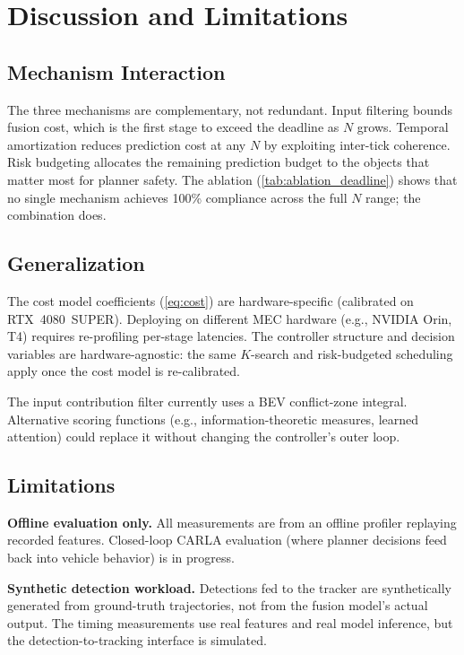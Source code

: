 \section{Discussion and Limitations}
\label{sec:discussion}

\subsection{Mechanism Interaction}

The three mechanisms are complementary, not redundant.  Input filtering
bounds fusion cost, which is the first stage to exceed the deadline as
$N$ grows.  Temporal amortization reduces prediction cost at any $N$ by
exploiting inter-tick coherence.  Risk budgeting allocates the
remaining prediction budget to the objects that matter most for planner
safety.  The ablation (\cref{tab:ablation_deadline}) shows that no
single mechanism achieves 100\% compliance across the full $N$ range;
the combination does.

\subsection{Generalization}

The cost model coefficients (\cref{eq:cost}) are hardware-specific
(calibrated on RTX~4080~SUPER).  Deploying on different MEC hardware
(e.g., NVIDIA Orin, T4) requires re-profiling per-stage latencies.
The controller structure and decision variables are hardware-agnostic:
the same $K$-search and risk-budgeted scheduling apply once the cost
model is re-calibrated.

The input contribution filter currently uses a BEV conflict-zone
integral.  Alternative scoring functions (e.g., information-theoretic
measures, learned attention) could replace it without changing the
controller's outer loop.

\subsection{Limitations}

\textbf{Offline evaluation only.}  All measurements are from an
offline profiler replaying recorded features.  Closed-loop CARLA
evaluation (where planner decisions feed back into vehicle behavior)
is in progress.

\textbf{Synthetic detection workload.}  Detections fed to the tracker
are synthetically generated from ground-truth trajectories, not from
the fusion model's actual output.  The timing measurements use real
features and real model inference, but the detection-to-tracking
interface is simulated.

